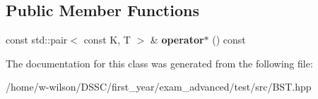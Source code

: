 \subsection*{Public Member Functions}
\begin{DoxyCompactItemize}
\item 
\mbox{\label{class_b_s_tree_1_1_const_iterator_ac402244b14fafd110a847907514d8ecc}} 
const std\+::pair$<$ const K, T $>$ \& {\bfseries operator$\ast$} () const
\end{DoxyCompactItemize}


The documentation for this class was generated from the following file\+:\begin{DoxyCompactItemize}
\item 
/home/w-\/wilson/\+D\+S\+S\+C/first\+\_\+year/exam\+\_\+advanced/test/src/B\+S\+T.\+hpp\end{DoxyCompactItemize}
